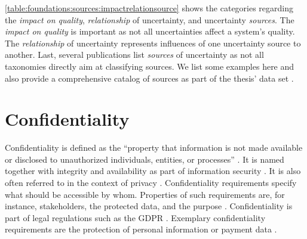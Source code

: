\autoref{table:foundations:sources:impactrelationsource} shows the categories regarding the \emph{impact on quality}, \emph{relationship} of uncertainty, and uncertainty \emph{sources}.
The \emph{impact on quality} is important as not all uncertainties affect a system's quality.
The \emph{relationship} of uncertainty represents influences of one uncertainty source to another.
Last, several publications list \emph{sources} of uncertainty as not all taxonomies directly aim at classifying sources. 
We list some examples here and also provide a comprehensive catalog of sources as part of the thesis' data set \cite{dataset}.






\section{Confidentiality}%
\label{sec:foundations:confidentiality}

Confidentiality is defined as the \enquote{property that information is not made available or disclosed to unauthorized individuals, entities, or processes} \cite{international_organization_for_standardization_isoiec_2018}.
It is named together with integrity and availability as part of information security \cite{international_organization_for_standardization_isoiec_2018}.
It is also often referred to in the context of privacy \cite{schaar_privacy_2010,sulochana_preserving_2015,boltz_modeling_2024,boltz_model-based_2022}.
Confidentiality requirements specify what should be accessible by whom.
Properties of such requirements are, for instance, stakeholders, the protected data, and the purpose \cite{onabajo_properties_2006}.
Confidentiality is part of legal regulations such as the \acf{GDPR} \cite{council_of_european_union_regulation_2016}.
Exemplary confidentiality requirements are the protection of personal information or payment data \cite{boltz_extensible_2024}.

